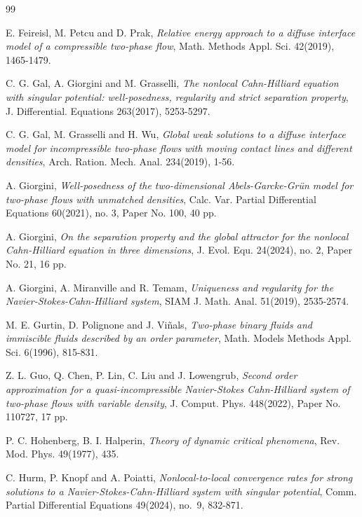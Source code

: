 \documentclass[reqno,a4paper,11pt]{amsart}
\theoremstyle{plain}
\numberwithin{equation}{section}
\begin{document}
\begin{thebibliography}{99}
	
	 E. Feireisl, M. Petcu and D. Prak, \textit{Relative energy approach to a diffuse interface model of a compressible two-phase flow}, Math. Methods Appl. Sci. 42(2019), 1465-1479.
	
	
	
	 C. G. Gal, A. Giorgini and M. Grasselli, \textit{ The nonlocal Cahn-Hilliard equation with singular potential: well-posedness, regularity and strict separation property}, J. Differential. Equations 263(2017), 5253-5297.
	
	
	 C. G. Gal, M. Grasselli and H. Wu, \textit{Global weak solutions to a diffuse interface model for incompressible two-phase flows with moving contact lines and different densities}, Arch. Ration. Mech. Anal. 234(2019), 1-56.
	
	 A. Giorgini, \textit{Well-posedness of the two-dimensional Abels-Garcke-Grün model for two-phase flows with unmatched densities}, Calc. Var. Partial Differential Equations 60(2021), no. 3, Paper No. 100, 40 pp.
	
	 A. Giorgini, \textit{On the separation property and the global attractor for the nonlocal Cahn-Hilliard equation in three dimensions}, J. Evol. Equ. 24(2024), no. 2, Paper No. 21, 16 pp.
	
	A. Giorgini, A. Miranville and R. Temam, \textit{Uniqueness and regularity for the Navier-Stokes-Cahn-Hilliard system}, SIAM J. Math. Anal. 51(2019), 2535-2574.
	
	
	
	  M. E. Gurtin, D. Polignone and J. Vi\~{n}als, \textit{Two-phase binary fluids and immiscible fluids described by an order parameter},
	Math. Models Methods Appl. Sci. 6(1996), 815-831.
	
	 Z. L. Guo,  Q. Chen, P. Lin, C. Liu and J. Lowengrub, \textit{ Second order
		approximation for a quasi-incompressible Navier-Stokes Cahn-Hilliard system of two-phase flows with variable density},
	J. Comput. Phys. 448(2022), Paper No. 110727, 17 pp.
	
	 P. C. Hohenberg, B. I. Halperin, \textit{ Theory of dynamic critical phenomena},
	Rev. Mod. Phys. 49(1977), 435.
	
	 C. Hurm, P. Knopf and A. Poiatti, \textit{Nonlocal-to-local convergence rates for strong solutions to a Navier-Stokes-Cahn-Hilliard system with singular potential}, Comm. Partial Differential Equations 49(2024), no.~9, 832-871.
	

\end{thebibliography}
\end{document}
